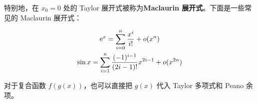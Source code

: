 特别地，在 $x_0 = 0$ 处的 Taylor 展开式被称为\textbf{Maclaurin 展开式}。下面是一些常见的 Maclaurin 展开式：

$$
\begin{gathered}
	\mathrm{e}^x = \sum_{i=0}^n \frac{x^i}{i!} + o(x^n) \\
	\sin x = \sum_{i=1}^n \frac{(-1)^{i-1}}{(2i - 1)!} x^{2i - 1} + o(x^{2n})
\end{gathered}
$$

对于复合函数 $f(g(x))$，也可以直接把 $g(x)$ 代入 Taylor 多项式和 Peano 余项。